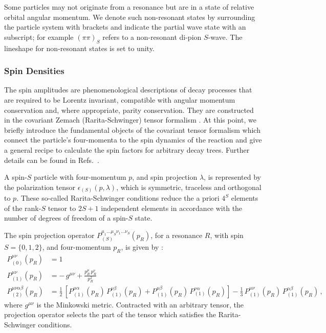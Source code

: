 Some particles may not originate from a resonance but are in a state of relative orbital angular momentum.
We denote such non-resonant states by surrounding the particle system with brackets  and indicate the partial wave state with an subscript;
for example $(\pi \pi)_S$ refers to a non-resonant di-pion $S$-wave.
The lineshape for non-resonant states is set to unity.

\clearpage
\subsubsection{Spin Densities}

The spin amplitudes are phenomenological descriptions
of decay processes that 
are required to be Lorentz invariant,
compatible with angular momentum conservation and,
where appropriate, parity conservation.
They are constructed in the covariant Zemach (Rarita-Schwinger) tensor formalism
\cite{Zemach,Rarita,helicity3}.
At this point, we briefly introduce 
the fundamental objects of the covariant tensor formalism 
which connect the particle's four-momenta to the spin dynamics of the reaction
and give a general recipe to calculate the spin factors for arbitrary decay trees.
Further details can be found in Refs.~\cite{Zou, Filippini}.

A spin-$S$ particle with four-momentum $p$, and spin projection $\lambda$, is represented 
by the polarization tensor $\epsilon_{(S)}(p,\lambda)$, which is symmetric, traceless and orthogonal to $p$.
These so-called Rarita-Schwinger conditions reduce the a priori $4^{S}$  elements of the rank-$S$ tensor to 
$2S +1$ independent  elements in accordance with the number of degrees of freedom of a spin-$S$ state\cite{Rarita,Zhu}.

The spin projection operator $P^{\mu_{1} \dots \mu_{S} \nu_{1} \dots \nu_{S}}_{(S)}(p_{R})$,  
for a resonance $R$, with spin $S = \{0,1,2\}$, and four-momentum $p_{R}$,
is given by \cite{Filippini}:
\begin{align}
	\nonumber
	P_{(0)}^{\mu \nu}(p_{R}) &= 1 \\
	\nonumber
	P_{(1)}^{\mu \nu}(p_{R}) &= %
	- \, g^{\mu \nu} + \frac{p_{R}^{\mu} \, p_{R}^{\nu}}{p_{R}^{2}}    \\
	P_{(2)}^{\mu \nu \alpha \beta}(p_{R})  &=
	 \frac{1}{2} \,  \left[ P_{(1)}^{\mu \alpha}(p_{R})  \, P_{(1)}^{\nu \beta}(p_{R})  + P_{(1)}^{\mu \beta}(p_{R})  \, P_{(1)}^{\nu \alpha}(p_{R}) \right] - \frac{1}{3} \, P_{(1)}^{\mu \nu}(p_{R}) 
	 \, P_{(1)}^{\alpha \beta}(p_{R})    \,,
	\label{eq:pol1}
\end{align}
where $ g^{\mu \nu}$ %
is the Minkowski metric.
Contracted with an arbitrary tensor, the projection operator selects 
the part of the tensor which satisfies the Rarita-Schwinger conditions.

